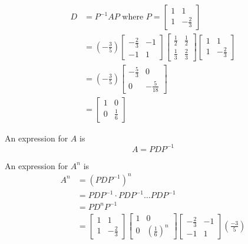 \documentclass[a4paper, 10pt]{article}
\begin{document}
\begin{align*}
   D &= P^{-1} A P \text{ where } P = \begin{bmatrix} 
      1 & 1 \\ 1 & - \frac{2}{3}
   \end{bmatrix} \\
     &= \left( - \frac{3}{5} \right) \begin{bmatrix} 
        - \frac{2}{3} & -1 \\ -1 & 1 
     \end{bmatrix} \begin{bmatrix} 
        \frac{1}{2} & \frac{1}{2} \\ \frac{1}{3}  & \frac{2}{3}
     \end{bmatrix} \begin{bmatrix} 
        1 & 1 \\ 1 & - \frac{2}{3}  
     \end{bmatrix} \\
     &= \left( - \frac{3}{5} \right)  \begin{bmatrix} 
        - \frac{5}{3} & 0 \\ 0 & - \frac{5}{18}  
     \end{bmatrix} \\
     &= \begin{bmatrix} 
        1 & 0 \\ 0 & \frac{1}{6}  
     \end{bmatrix}
\end{align*}

An expression for $A$ is
\[
   A = PDP^{-1}
\] 

An expression for $A^n$ is
 \begin{align*}
    A^n &= \left( PDP^{-1} \right)^n \\
        &= PDP^{-1} \cdot PDP^{-1} \hdots PDP^{-1} \\
        &= PD^n P^{-1} \\
        &= \begin{bmatrix} 
           1 & 1 \\ 1 & - \frac{2}{3}
        \end{bmatrix} \begin{bmatrix} 
           1 & 0 \\ 0 & \left( \frac{1}{6} \right)^n
        \end{bmatrix} \begin{bmatrix} 
           - \frac{2}{3}   & -1 \\ -1 & 1
        \end{bmatrix} \left( \frac{-3}{5} \right) 
\end{align*}
\end{document}
